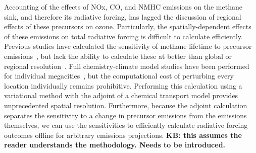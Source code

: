 Accounting of the effects of NOx, CO, and NMHC emissions on the methane sink, and therefore its radiative forcing, has lagged the discussion of regional effects of these precursors on ozone. Particularly, the spatially-dependent effects of these emissions on total radiative forcing is difficult to calculate efficiently. Previous studies have calculated the sensitivity of methane lifetime to precursor emissions~\citep{ref:prather2001,ref:fry2012,ref:holmes2013}, but lack the ability to calculate these at better than global or regional resolution~\citep{ref:naik2005,ref:macintosh2015}. Full chemistry-climate model studies have been performed for individual megacities~\citep{ref:dang2015}, but the computational cost of perturbing every location individually remains prohibitive. Performing this calculation using a variational method with the adjoint of a chemical transport model provides unprecedented spatial resolution. Furthermore, because the adjoint calculation separates the sensitivity to a change in precursor emissions from the emissions themselves, we can use the sensitivities to efficiently calculate radiative forcing outcomes offline for arbitrary emissions projections. \textbf{KB: this assumes the reader understands the methodology.  Needs to be introduced.}
